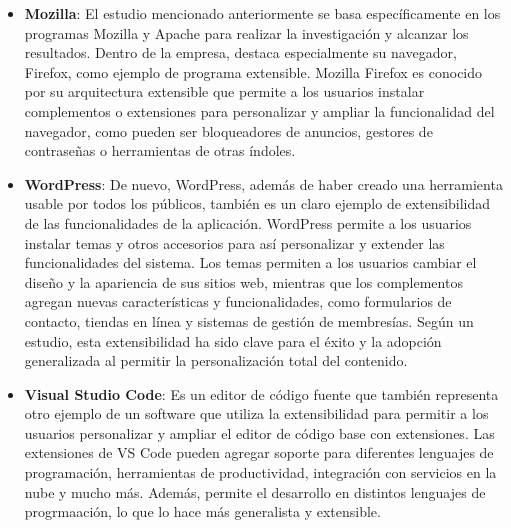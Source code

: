 \begin{itemize}
	
	\item \textbf{Mozilla}: El estudio mencionado anteriormente  \citep{mockus2002two} se basa específicamente en los programas Mozilla y Apache para realizar la investigación y alcanzar los resultados. Dentro de la empresa, destaca especialmente su navegador, Firefox, como ejemplo de programa extensible. Mozilla Firefox es conocido por su arquitectura extensible que permite a los usuarios instalar complementos o extensiones para personalizar y ampliar la funcionalidad del navegador, como pueden ser bloqueadores de anuncios, gestores de contraseñas o herramientas de otras índoles.
	
	\item \textbf{WordPress}: De nuevo, WordPress, además de haber creado una herramienta usable por todos los públicos, también es un claro ejemplo de extensibilidad de las funcionalidades de la aplicación. WordPress permite a los usuarios instalar temas y otros accesorios para así personalizar y extender las funcionalidades del sistema. Los temas permiten a los usuarios cambiar el diseño y la apariencia de sus sitios web, mientras que los complementos agregan nuevas características y funcionalidades, como formularios de contacto, tiendas en línea y sistemas de gestión de membresías. Según un estudio, esta extensibilidad ha sido clave para el éxito y la adopción generalizada al permitir la personalización total del contenido.
	
	\item \textbf{Visual Studio Code}: Es un editor de código fuente que también representa otro ejemplo de un software que utiliza la extensibilidad para permitir a los usuarios personalizar y ampliar el editor de código base con extensiones. Las extensiones de VS Code pueden agregar soporte para diferentes lenguajes de programación, herramientas de productividad, integración con servicios en la nube y mucho más. Además, permite el desarrollo en distintos lenguajes de progrmaación, lo que lo hace más generalista y extensible.
	
	
\end{itemize}

